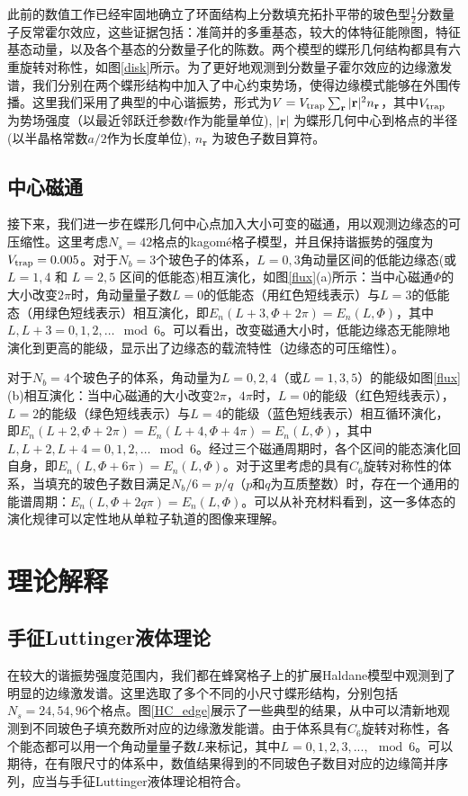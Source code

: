 此前的数值工作已经牢固地确立了环面结构上分数填充拓扑平带的玻色型$\frac{1}{2}$分数量子反常霍尔效应，这些证据包括：准简并的多重基态，较大的体特征能隙图，特征基态动量，以及各个基态的分数量子化的陈数。两个模型的蝶形几何结构都具有六重旋转对称性，如图\ref{disk}所示。为了更好地观测到分数量子霍尔效应的边缘激发谱，我们分别在两个蝶形结构中加入了中心约束势场，使得边缘模式能够在外围传播。这里我们采用了典型的中心谐振势，形式为$V = V_{\rm trap}\sum_{\mathbf{r}} |\mathbf{r}|^2 n_{\mathbf{r}}$，其中$V_{\rm trap}$ 为势场强度（以最近邻跃迁参数$t$作为能量单位), $|{\mathbf{r}}|$ 为蝶形几何中心到格点的半径(以半晶格常数$a/2$作为长度单位),  $n_{\mathbf{r}}$ 为玻色子数目算符。


\subsection{中心磁通}
接下来，我们进一步在蝶形几何中心点加入大小可变的磁通，用以观测边缘态的可压缩性。这里考虑$N_s=42$格点的kagom\'{e}格子模型，并且保持谐振势的强度为$V_{\rm trap}=0.005$。对于$N_b=3$个玻色子的体系，$L= 0, 3$角动量区间的低能边缘态(或 $L= 1, 4$ 和 $L= 2, 5$ 区间的低能态)相互演化，如图\ref{flux}(a)所示：当中心磁通$\Phi$的大小改变$2\pi$时，角动量量子数$L= 0$的低能态（用红色短线表示）与$L= 3$的低能态（用绿色短线表示）相互演化，即$E_n(L+3,\Phi+2\pi)=E_n(L,\Phi)$，其中$L,L+3=0,1,2,\dots\mod 6$。可以看出，改变磁通大小时，低能边缘态无能隙地演化到更高的能级，显示出了边缘态的载流特性（边缘态的可压缩性）。

对于$N_b=4$个玻色子的体系，角动量为$L= 0, 2, 4$（或$L= 1, 3, 5$）的能级如图\ref{flux}(b)相互演化：当中心磁通的大小改变$2\pi$，$4\pi$时，$L= 0$的能级（红色短线表示），$L= 2$的能级（绿色短线表示）与$L= 4$的能级（蓝色短线表示）相互循环演化，即$E_n(L+2,\Phi+2\pi)=E_n(L+4,\Phi+4\pi)=E_n(L,\Phi)$，其中$L,L+2,L+4=0,1,2,\dots\mod 6$。经过三个磁通周期时，各个区间的能态演化回自身，即$E_n(L,\Phi+6\pi)=E_n(L,\Phi)$。对于这里考虑的具有$C_6$旋转对称性的体系，当填充的玻色子数目满足$N_b/6=p/q$（$p$和$q$为互质整数）时，存在一个通用的能谱周期：$E_n(L,\Phi+2q\pi)=E_n(L,\Phi)$。可以从补充材料\cite{supply}看到，这一多体态的演化规律可以定性地从单粒子轨道的图像来理解。


\section{理论解释}

\subsection{手征Luttinger液体理论}
在较大的谐振势强度范围内，我们都在蜂窝格子上的扩展Haldane模型中观测到了明显的边缘激发谱。这里选取了多个不同的小尺寸蝶形结构，分别包括 $N_s = 24, 54, 96$个格点。图\ref{HC_edge}展示了一些典型的结果，从中可以清新地观测到不同玻色子填充数所对应的边缘激发能谱。由于体系具有$C_6$旋转对称性，各个能态都可以用一个角动量量子数$L$来标记，其中$L = 0, 1, 2, 3,..., \mod 6$。可以期待，在有限尺寸的体系中，数值结果得到的不同玻色子数目对应的边缘简并序列，应当与手征Luttinger液体理论相符合。

